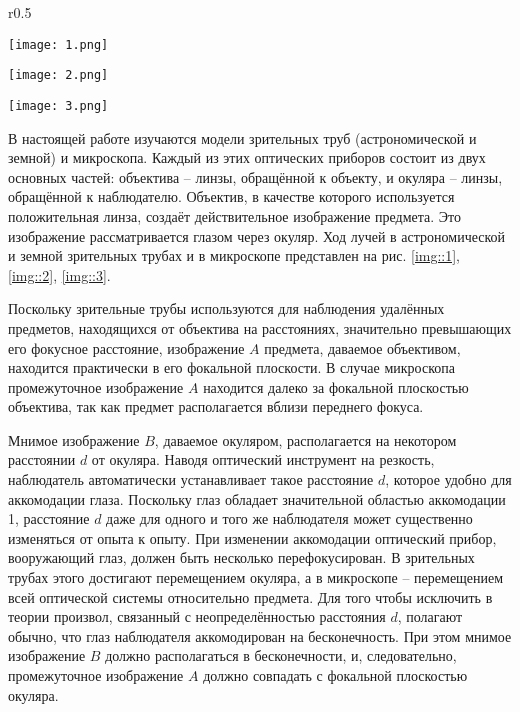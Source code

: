 \begin{wrapfigure}{r}{0.5\linewidth}
  \begin{center}
    \texttt{[image: 1.png]}
  \end{center}
  \caption{Ход лучей в трубе Кеплера}
  \label{img::1}
  \begin{center}
    \texttt{[image: 2.png]}
  \end{center}
  \caption{Ход лучей в трубе Галилея}
  \label{img::2}
  \begin{center}
    \texttt{[image: 3.png]}
  \end{center}
  \caption{Ход лучей в микроскопе}
  \label{img::3}
\end{wrapfigure}

В настоящей работе изучаются модели зрительных труб (астрономической и земной) и микроскопа. 
Каждый из этих оптических приборов состоит из двух основных частей: объектива -- линзы, 
обращённой к объекту, и окуляра -- линзы, обращённой к наблюдателю. Объектив, в качестве 
которого используется положительная линза, создаёт действительное изображение предмета. 
Это изображение рассматривается глазом через окуляр. Ход лучей в астрономической
и земной зрительных трубах и в микроскопе представлен на рис. \ref{img::1}, \ref{img::2}, \ref{img::3}.

Поскольку зрительные трубы используются для наблюдения удалённых предметов, находящихся
от объектива на расстояниях, значительно превышающих его фокусное расстояние, изображение
$A$ предмета, даваемое объективом, находится практически в его фокальной плоскости. В 
случае микроскопа промежуточное изображение $A$ находится далеко за фокальной плоскостью
объектива, так как предмет располагается вблизи переднего фокуса.

Мнимое изображение $B$, даваемое окуляром, располагается на некотором расстоянии $d$ от 
окуляра. Наводя оптический инструмент на резкость, наблюдатель автоматически устанавливает
такое расстояние $d$, которое удобно для аккомодации глаза. Поскольку глаз обладает 
значительной областью аккомодации 1, расстояние $d$ даже для одного и того же наблюдателя
может существенно изменяться от опыта к опыту. При изменении аккомодации оптический прибор, 
вооружающий глаз, должен быть несколько перефокусирован. В зрительных трубах этого достигают 
перемещением окуляра, а в микроскопе -- перемещением всей оптической системы относительно 
предмета. Для того чтобы исключить в теории произвол, связанный с неопределённостью 
расстояния $d$, полагают обычно, что глаз наблюдателя аккомодирован на бесконечность.
При этом мнимое изображение $B$ должно располагаться в бесконечности, и, следовательно,
промежуточное изображение $A$ должно совпадать с фокальной плоскостью окуляра.

